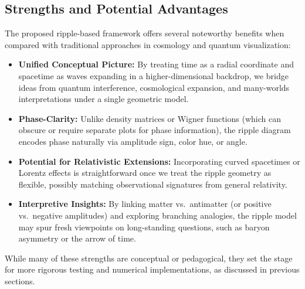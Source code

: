 \documentclass[11pt]{article}
\begin{document}
\subsection{Strengths and Potential Advantages}
\label{subsec:strengths-advantages}
The proposed ripple-based framework offers several noteworthy benefits when 
compared with traditional approaches in cosmology and quantum visualization:
\begin{itemize}
  \item \textbf{Unified Conceptual Picture:} 
    By treating time as a radial coordinate and spacetime as waves expanding 
    in a higher-dimensional backdrop, we bridge ideas from quantum interference, 
    cosmological expansion, and many-worlds interpretations under a single 
    geometric model.
  \item \textbf{Phase-Clarity:} 
    Unlike density matrices or Wigner functions (which can obscure or require 
    separate plots for phase information), the ripple diagram encodes phase 
    naturally via amplitude sign, color hue, or angle.
  \item \textbf{Potential for Relativistic Extensions:} 
    Incorporating curved spacetimes or Lorentz effects is straightforward 
    once we treat the ripple geometry as flexible, possibly matching 
    observational signatures from general relativity.
  \item \textbf{Interpretive Insights:} 
    By linking matter vs.\ antimatter (or positive vs.\ negative amplitudes) 
    and exploring branching analogies, the ripple model may spur fresh viewpoints 
    on long-standing questions, such as baryon asymmetry or the arrow of time.
\end{itemize}
While many of these strengths are conceptual or pedagogical, they set the stage 
for more rigorous testing and numerical implementations, as discussed in previous 
sections.
\end{document}
